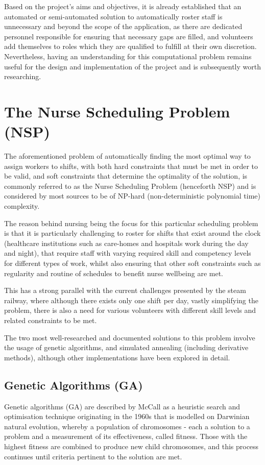 Based on the project's aims and objectives, it is already established that an automated or semi-automated solution to automatically roster staff is unnecessary and beyond the scope of the application, as there are dedicated personnel responsible for ensuring that necessary gaps are filled, and volunteers add themselves to roles which they are qualified to fulfill at their own discretion. Nevertheless, having an understanding for this computational problem remains useful for the design and implementation of the project and is subsequently worth researching.

\section{The Nurse Scheduling Problem (NSP)}
The aforementioned problem of automatically finding the most optimal way to assign workers to shifts, with both hard constraints that must be met in order to be valid, and soft constraints that determine the optimality of the solution, is commonly referred to as the Nurse Scheduling Problem (henceforth NSP) and is considered by most sources to be of NP-hard (non-deterministic polynomial time) complexity. \cite{Tassopoulos2013} 

The reason behind nursing being the focus for this particular scheduling problem is that it is particularly challenging to roster for shifts that exist around the clock (healthcare institutions such as care-homes and hospitals work during the day and night), that require staff with varying required skill and competency levels for different types of work, whilst also ensuring that other soft constraints such as regularity and routine of schedules to benefit nurse wellbeing are met. \cite{Burke2004}

This has a strong parallel with the current challenges presented by the steam railway, where although there exists only one shift per day, vastly simplifying the problem, there is also a need for various volunteers with different skill levels and related constraints to be met.

The two most well-researched and documented solutions to this problem involve the usage of genetic algorithms, and simulated annealing (including derivative methods), although other implementations have been explored in detail.

\subsection{Genetic Algorithms (GA)}
Genetic algorithms (GA) are described by McCall as a heuristic search and optimisation technique originating in the 1960s that is modelled on Darwinian natural evolution, whereby a population of chromosomes - each a solution to a problem and a measurement of its effectiveness, called fitness. Those with the highest fitness are combined to produce new child chromosomes, and this process continues until criteria pertinent to the solution are met. \cite{MCCALL2005205}

